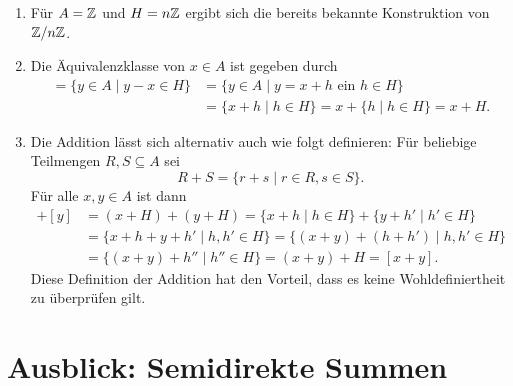 \begin{bem}
 \begin{enumerate}[leftmargin=*]
  \item
   Für $A = \mathbb{Z}$ und $H = n\mathbb{Z}$ ergibt sich die bereits bekannte Konstruktion von $\mathbb{Z}/n\mathbb{Z}$.
  \item
   Die Äquivalenzklasse von $x \in A$ ist gegeben durch
   \begin{align*}
    [x]
    = \{y \in A \mid y-x \in H\}
    &= \{y \in A \mid \text{$y = x + h$ ein $h \in H$}\} \\
    &= \{x+h \mid h \in H\}
    = x + \{h \mid h \in H\}
    = x + H.
   \end{align*}
  \item
   Die Addition lässt sich alternativ auch wie folgt definieren: Für beliebige Teilmengen $R, S \subseteq A$ sei
   \[
    R + S = \{r+s \mid r \in R, s \in S\}.
   \]
   Für alle $x,y \in A$ ist dann
   \begin{align*}
    [x] + [y]
    &= (x+H) + (y+H)
    = \{x+h \mid h \in H\} + \{y+h' \mid h' \in H\} \\
    &= \{x+h+y+h' \mid h, h' \in H\}
    = \{(x+y)+(h+h') \mid h,h' \in H\} \\
    &= \{(x+y)+h'' \mid h'' \in H\}
    = (x+y)+H
    = [x+y].
   \end{align*}
   Diese Definition der Addition hat den Vorteil, dass es keine Wohldefiniertheit zu überprüfen gilt.
 \end{enumerate}
\end{bem}





\section{Ausblick: Semidirekte Summen}






















